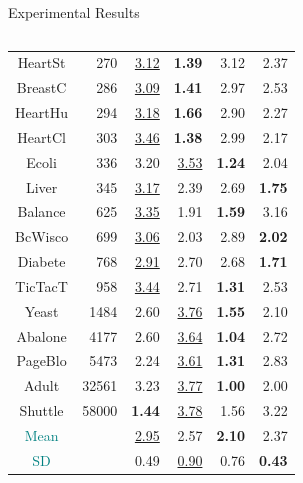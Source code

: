 \documentclass[final]{beamer}
\begin{document}
\begin{frame}{}
\begin{block}{Experimental Results}
\begin{columns}[T]
\begin{column}{0.55\textwidth}
\begin{minipage}{0.35\textwidth}
{\begin{table}
\begin{center}
\begin{tabular}{crrrrr}
		 HeartSt &    270 &  \underline{3.12} &     \textbf{1.39} &              3.12 &           2.37 \\
		 BreastC &    286 &  \underline{3.09} &     \textbf{1.41} &              2.97 &           2.53 \\
		 HeartHu &    294 &  \underline{3.18} &     \textbf{1.66} &              2.90 &           2.27 \\
		 HeartCl &    303 &  \underline{3.46} &     \textbf{1.38} &              2.99 &           2.17 \\
		   Ecoli &    336 &              3.20 &  \underline{3.53} &     \textbf{1.24} &           2.04 \\
		   Liver &    345 &  \underline{3.17} &              2.39 &              2.69 &  \textbf{1.75} \\
		 Balance &    625 &  \underline{3.35} &              1.91 &     \textbf{1.59} &           3.16 \\
		 BcWisco &    699 &  \underline{3.06} &              2.03 &              2.89 &  \textbf{2.02} \\
		 Diabete &    768 &  \underline{2.91} &              2.70 &              2.68 &  \textbf{1.71} \\
		 TicTacT &    958 &  \underline{3.44} &              2.71 &     \textbf{1.31} &           2.53 \\
		   Yeast &   1484 &              2.60 &  \underline{3.76} &     \textbf{1.55} &           2.10 \\
		 Abalone &   4177 &              2.60 &  \underline{3.64} &     \textbf{1.04} &           2.72 \\
		 PageBlo &   5473 &              2.24 &  \underline{3.61} &     \textbf{1.31} &           2.83 \\
		   Adult &  32561 &              3.23 &  \underline{3.77} &     \textbf{1.00} &           2.00 \\
		 Shuttle &  58000 &     \textbf{1.44} &  \underline{3.78} &              1.56 &           3.22 \\
		\midrule		 
		 \textcolor{teal}{Mean} &  \phantom{} & \underline{2.95}  & 2.57 & \textbf{2.10}  &2.37 \\
		 \textcolor{teal}{SD}  &  \phantom{} & 0.49 & \underline{0.90} &0.76 & \textbf{0.43} \\
		\end{tabular}
		\end{center}
		\end{table}}	
	\end{minipage}
	\begin{minipage}{0.3\textwidth}
	

\end{minipage}
\end{column}
\end{columns}
\end{block}
\end{frame}
\end{document}
